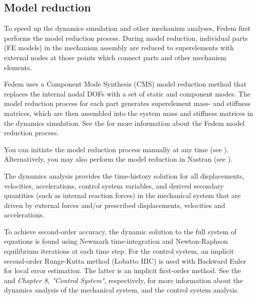 \clearpage



\subsection{Model reduction}

To speed up the dynamics simulation and other mechanism analyses,
Fedem first performs the model reduction process.
During model reduction, individual parts (FE models) in the mechanism assembly
are reduced to superelements with external nodes at those points which connect
parts and other mechanism elements.

Fedem uses a Component Mode Synthesis (CMS) model reduction method that replaces
the internal nodal DOFs with a set of static and component modes.
The model reduction process for each part generates superelement mass- and
stiffness matrices, which are then assembled into the system mass and stiffness
matrices in the dynamics simulation.
See the 
for more information about the Fedem model reduction process.

You can initiate the model reduction process manually at any time
(see ).
Alternatively, you may also perform the model reduction in Nastran
(see ).



The dynamics analysis provides the time-history solution for all displacements,
velocities, accelerations, control system variables, and derived secondary
quantities (such as internal reaction forces) in the mechanical system that are
driven by external forces and/or prescribed displacements, velocities and
accelerations.

To achieve second-order accuracy, the dynamic solution to the full system of
equations is found using Newmark time-integration and Newton-Raphson equilibrium
iterations at each time step.
For the control system, an implicit second-order Runge-Kutta method
(Lobatto IIIC) is used with Backward Euler for local error estimation.
The latter is an implicit first-order method.
See the 
and {\sl Chapter 8, "Control System"}, respectively, for more information about
the dynamics analysis of the mechanical system, and the control system analysis.


